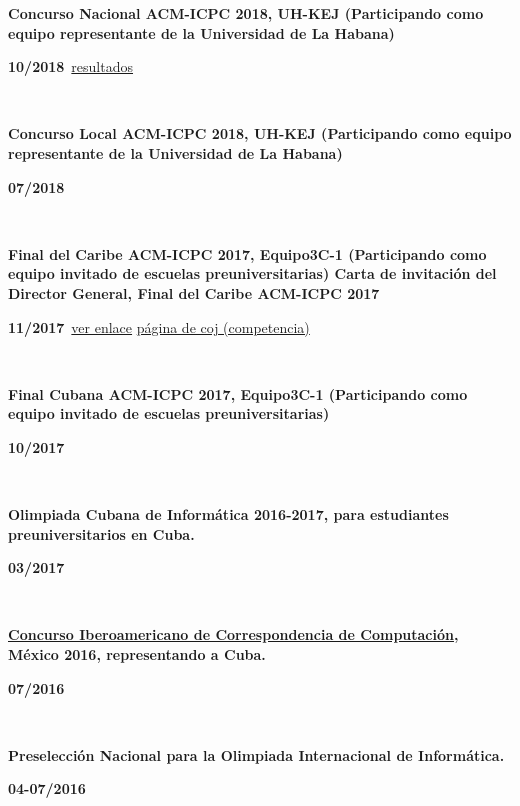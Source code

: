\documentclass{article}
\begin{document}
\begin{minipage}{0.8\textwidth}
\parbox{0.8\linewidth}{\textbf{Concurso Nacional ACM-ICPC 2018, UH-KEJ (Participando como equipo representante de la Universidad de La Habana)} }\hfill \textbf{10/2018}\
\href{https://icpc.global/regionals/finder/cnc-2018/standings}{resultados}
\
\end{minipage} \hfill {}\\
\begin{minipage}{0.8\textwidth}
\parbox{0.8\linewidth}{\textbf{Concurso Local ACM-ICPC 2018, UH-KEJ (Participando como equipo representante de la Universidad de La Habana)}} \hfill \textbf{07/2018}\
\
\end{minipage} \hfill {}\\
\begin{minipage}{0.8\textwidth}
\parbox{0.8\linewidth}{\textbf{Final del Caribe ACM-ICPC 2017, Equipo3C-1 (Participando como equipo invitado de escuelas preuniversitarias)
Carta de invitación del Director General, Final del Caribe ACM-ICPC 2017}} \hfill \textbf{11/2017}\
\href{https://matcomgrader.com/post/5167/the-2017-acm-icpc-caribbean-finals}{ver enlace}
\href{https://coj-forum.uci.cu/viewtopic.php?t=3315}{página de coj (competencia)}
\
\end{minipage} \hfill {}\\
\begin{minipage}{0.8\textwidth}
\parbox{0.8\linewidth}{\textbf{Final Cubana ACM-ICPC 2017, Equipo3C-1 (Participando como equipo invitado de escuelas preuniversitarias)}} \hfill \textbf{10/2017}\
\
\end{minipage}\
\begin{minipage}{0.8\textwidth}
\parbox{0.8\linewidth}{\textbf{Olimpiada Cubana de Informática 2016-2017, para estudiantes preuniversitarios en Cuba.}} \hfill \textbf{03/2017}\
\
\end{minipage}\
\begin{minipage}{0.8\textwidth}
\parbox{0.8\linewidth}{\textbf{\hyperref[sec:ibero]{Concurso Iberoamericano de Correspondencia de Computación}, México 2016, representando a Cuba.}} \hfill \textbf{07/2016}\
\
\end{minipage}\
\begin{minipage}{0.8\textwidth}
\parbox{0.8\linewidth}{\textbf{Preselección Nacional para la Olimpiada Internacional de Informática.}} \hfill \textbf{04-07/2016}\
\
\end{minipage}\
\end{document}
